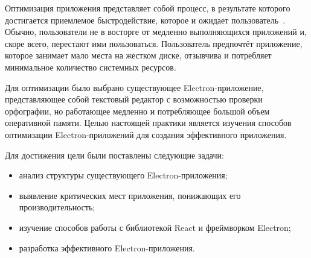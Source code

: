 \intro

Оптимизация приложения представляет собой процесс, в результате которого достигается приемлемое быстродействие, которое и ожидает пользователь~\cite{effProg}. Обычно, пользователи не в восторге от медленно выполняющихся приложений и, скоре всего, перестают ими пользоваться. Пользователь предпочтёт приложение, которое занимает мало места на жестком диске, отзывчива и потребляет минимальное количество системных ресурсов.

Для оптимизации было выбрано существующее Electron-приложение, представляющее собой текстовый редактор с возможностью проверки орфографии, но работающее медленно и потребляющее большой объем оперативной памяти. Целью настоящей практики является изучения способов оптимизации Electron-приложений для создания эффективного приложения.

Для достижения цели были поставлены следующие задачи:

\begin{itemize}
  \item анализ структуры существующего Electron-приложения;
  \item выявление критических мест приложения, понижающих его производительность;
  \item изучение способов работы с библиотекой React и фреймворком Electron;
  \item разработка эффективного Electron-приложения.
\end{itemize}
